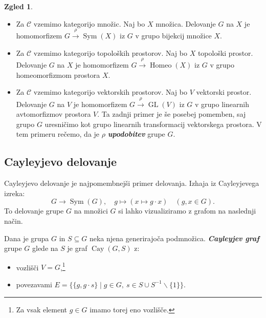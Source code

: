 \documentclass[11pt]{book}
\DeclareMathOperator\GL{GL}
\DeclareMathOperator\Sym{Sym}
\DeclareMathOperator\Homeo{Homeo}
\DeclareMathOperator\Cay{Cay}
\def\definicija{\color{rdeca}\bf\em}
\theoremstyle{definition}
\theoremstyle{zgled}
\newtheorem*{zgled}{Zgled}
\theoremstyle{odprtproblem}
\theoremstyle{domacanaloga}
\theoremstyle{izrek}
\begin{document}
\begin{zgled}
\begin{itemize}
    \item Za $\mathcal{C}$ vzemimo kategorijo množic. Naj bo $X$ množica. Delovanje $G$ na $X$ je homomorfizem $G \xrightarrow{\rho} \Sym(X)$ iz $G$ v grupo bijekcij množice $X$.

    \item Za $\mathcal{C}$ vzemimo kategorijo topoloških prostorov. Naj bo $X$ topološki prostor. Delovanje $G$ na $X$ je homomorfizem $G \xrightarrow{\rho} \Homeo(X)$ iz $G$ v grupo homeomorfizmom prostora $X$.

    \item Za $\mathcal{C}$ vzemimo kategorijo vektorskih prostorov. Naj bo $V$ vektorski prostor. Delovanje $G$ na $V$ je homomorfizem $G \xrightarrow{\rho} \GL(V)$ iz $G$ v grupo linearnih avtomorfizmov prostora $V$. Ta zadnji primer je še posebej pomemben, saj grupo $G$ uresničimo kot grupo linearnih transformacij vektorskega prostora. V tem primeru rečemo, da je $\rho$ {\definicija upodobitev} grupe $G$.
\end{itemize}
\end{zgled}

\subsection{Cayleyjevo delovanje}

Cayleyjevo delovanje je najpomembnejši primer delovanja. Izhaja iz Cayleyjevega izreka:
\[
G \to \Sym(G), \quad g \mapsto (x \mapsto g \cdot x) \quad (g,x \in G).
\]
To delovanje grupe $G$ na množici $G$ si lahko vizualiziramo z grafom na naslednji način.

Dana je grupa $G$ in $S \subseteq G$ neka njena generirajoča podmnožica. {\definicija Cayleyjev graf} grupe $G$ glede na $S$ je graf {\definicija $\Cay(G,S)$} z:
\begin{itemize}
    \item vozlišči $V = G$,\footnote{Za vsak element $g \in G$ imamo torej eno vozlišče.}
    \item povezavami $E = \{ \{ g, g \cdot s \} \mid g \in G, \ s \in S \cup S^{-1} \backslash \{ 1 \} \}$.
\end{itemize}
\end{document}
